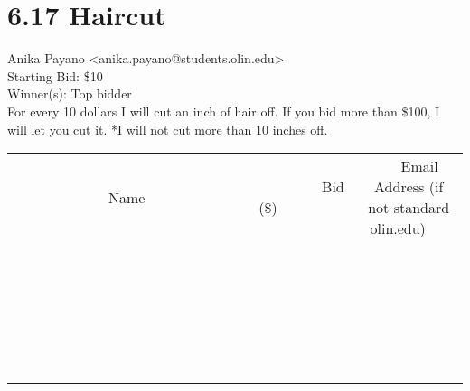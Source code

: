 \documentclass[11pt]{article}
\begin{document}
					\section*{6.17 Haircut}
					Anika Payano <anika.payano@students.olin.edu> \\
					Starting Bid: \$10 \\
					Winner(s): Top bidder \\
					For every 10 dollars I will cut an inch of hair off. If you bid more than \$100, I will let you cut it.  *I will not cut more than 10 inches off. \\
					[6ex]
					\begin{tabular}{c c c}
						~~~~~~~~~~~~~Name~~~~~~~~~~~~~ & ~~~~~~~~~Bid (\$)~~~~~~~~~ & ~~~Email Address (if not standard olin.edu)~~~ \\
				
 & & \\
\hline
 & & \\
\hline
 & & \\
\hline
 & & \\
\hline
 & & \\
\hline
 & & \\
\hline
 & & \\
\hline
 & & \\
\hline
 & & \\
\hline
 & & \\
\hline
 & & \\
\hline
 & & \\
\hline
 & & \\
\hline
 & & \\
\hline
 & & \\
\hline
 & & \\
\hline
 & & \\
\hline
 & & \\
\hline
 & & \\
\hline
 & & \\
\hline
 & & \\
\hline
 & & \\
\hline
 & & \\
\hline
 & & \\
\hline
 & & \\
\hline
 & & \\
\hline
					\end{tabular}
					\clearpage
				
\end{document}
